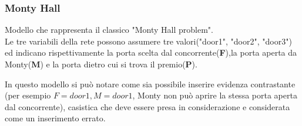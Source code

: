 \documentclass[a4paper]{article}
\begin{document}
\subsubsection{Monty Hall}
Modello che rappresenta il classico "Monty Hall problem".\\
Le tre variabili della rete possono assumere tre valori("door1", "door2", "door3") ed indicano rispettivamente la porta scelta dal concorrente(\textbf{F}),la porta aperta da Monty(\textbf{M}) e la porta dietro cui si trova il premio(\textbf{P}).

\begin{table}[H]
\end{table}
In questo modello si può notare come sia possibile inserire evidenza contrastante (per esempio $F=door1,M=door1$, Monty non può aprire la stessa porta aperta dal concorrente), casistica che deve essere presa in considerazione e considerata come un inserimento errato.
\end{document}
